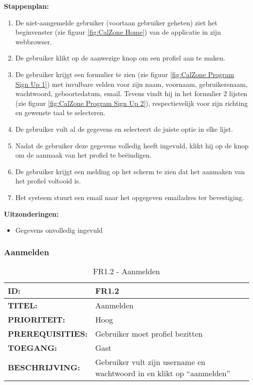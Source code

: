 \textbf{Stappenplan:}
\begin{enumerate}
\item De niet-aangemelde gebruiker (voortaan gebruiker geheten) ziet het beginvenster (zie figuur \ref{fig:CalZone Home}) van de applicatie in zijn webbrowser.
\item De gebruiker klikt op de aanwezige knop om een profiel aan te maken.
\item De gebruiker krijgt een formulier te zien (zie figuur \ref{fig:CalZone Program Sign Up 1}) met invulbare velden voor zijn naam, voornaam, gebruikersnaam, wachtwoord, geboortedatum, email. Tevens vindt hij in het formulier 2 lijsten (zie figuur \ref{fig:CalZone Program Sign Up 2}), respectievelijk voor zijn richting en gewenste taal te selecteren.
\item De gebruiker vult al de gegevens en selecteert de juiste optie in elke lijst.
\item Nadat de gebruiker deze gegevens volledig heeft ingevuld, klikt hij op de knop om de aanmaak van het profiel te beëindigen.
\item De gebruiker krijgt een melding op het scherm te zien dat het aanmaken van het profiel voltooid is.
\item Het systeem stuurt een email naar het opgegeven emailadres ter bevestiging.
\end{enumerate}

\textbf{Uitzonderingen:}
\begin{itemize}
\item Gegevens onvolledig ingevuld
\end{itemize}

\subsubsection{Aanmelden}
\noindent\begin{table}[H]
            \begin{tabular}{l | p{10cm}}
                \textbf{ID:} & FR1.2 \\ \hline
                \textbf{TITEL:} & Aanmelden \\ \hline
                \textbf{PRIORITEIT:} &  Hoog \\ \hline
                \textbf{PREREQUISITIES:} & Gebruiker moet profiel bezitten\\ \hline
                \textbf{TOEGANG:} &  Gast \\ \hline
                \textbf{BESCHRIJVING:} & Gebruiker vult zijn username en wachtwoord in en klikt op “aanmelden”\\
            \end{tabular}
            \caption{FR1.2 - Aanmelden}
            \label{tab:FR1.2 - Aanmelden}
        \end{table}
        
